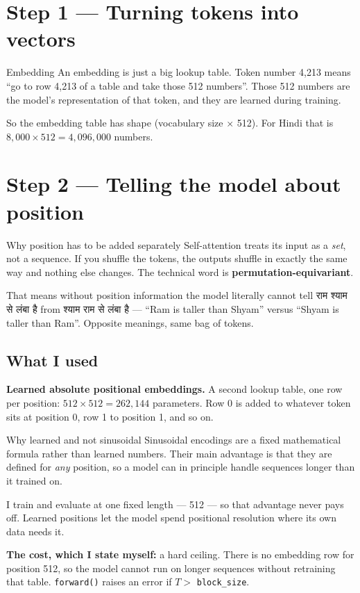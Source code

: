 \documentclass[11pt]{report}
\newcommand{\dn}[1]{{\devanagarifont #1}}
\newcommand{\p}[1]{\texttt{#1}}
\begin{document}
\section{Step 1 --- Turning tokens into vectors}

\begin{concept}{Embedding}
An embedding is just a big lookup table. Token number 4,213 means ``go to row
4,213 of a table and take those 512 numbers''. Those 512 numbers are the model's
representation of that token, and they are learned during training.

So the embedding table has shape (vocabulary size $\times$ 512). For Hindi that
is $8{,}000 \times 512 = 4{,}096{,}000$ numbers.
\end{concept}

\section{Step 2 --- Telling the model about position}
\label{sec:rope}

\begin{concept}{Why position has to be added separately}
Self-attention treats its input as a \emph{set}, not a sequence. If you shuffle
the tokens, the outputs shuffle in exactly the same way and nothing else
changes. The technical word is \textbf{permutation-equivariant}.

That means without position information the model literally cannot tell
\dn{राम श्याम से लंबा है} from \dn{श्याम राम से लंबा है} --- ``Ram is taller
than Shyam'' versus ``Shyam is taller than Ram''. Opposite meanings, same bag of
tokens.
\end{concept}

\subsection{What I used}

\textbf{Learned absolute positional embeddings.} A second lookup table, one row
per position: $512 \times 512 = 262{,}144$ parameters. Row 0 is added to
whatever token sits at position 0, row 1 to position 1, and so on.

\begin{implementation}{Why learned and not sinusoidal}
Sinusoidal encodings are a fixed mathematical formula rather than learned
numbers. Their main advantage is that they are defined for \emph{any} position,
so a model can in principle handle sequences longer than it trained on.

I train and evaluate at one fixed length --- 512 --- so that advantage never
pays off. Learned positions let the model spend positional resolution where its
own data needs it.

\medskip
\textbf{The cost, which I state myself:} a hard ceiling. There is no embedding
row for position 512, so the model cannot run on longer sequences without
retraining that table. \p{forward()} raises an error if $T >$ \p{block\_size}.
\end{implementation}
\end{document}
